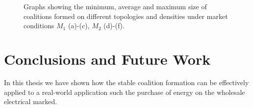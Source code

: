 \documentclass[11pt, twoside, titlepage, a4paper, openright]{report}
\begin{document}
\begin{figure}
  \hspace{-0.1in}
  \hspace{-0.1in}  
  \caption{Graphs showing the minimum, average and maximum size of
  coalitions formed on different topologies and densities under market conditions $M_1$ (a)-(c), $M_2$
  (d)-(f). }
  \label{fig:graphs_size}
\end{figure}    


\chapter{Conclusions and Future Work}\label{chap:concl}

In this thesis we have shown how the stable coalition formation can be effectively applied to a real-world application such the purchase of energy on the wholesale electrical marked. 
\end{document}
